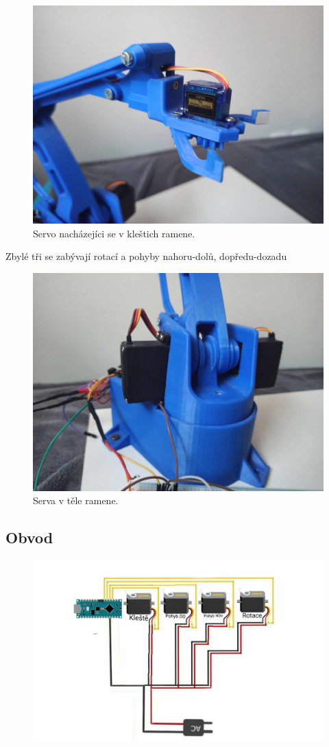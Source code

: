 \documentclass[12pt, a4paper,
twoside,        %
openright
]{report}
\begin{document}
{\begin{figure}[h]
	\centering
	\includegraphics[width=0.5\linewidth]{image/kleste.jpg} 
	
	\caption{Servo nacházejíci se v kleštich ramene\cite{servo-kleste}.} %
	\label{fig:Servo-kleste} %
\end{figure}

	Zbylé tři se zabývají rotací a pohyby nahoru-dolů, dopředu-dozadu

\begin{figure}[h]
	
	\centering
	\includegraphics[width=0.5\linewidth]{image/serva.jpg} 
	
	\caption{Serva v těle ramene.} %
	\label{fig:Serva} %
\end{figure}

\newpage

\subsection{Obvod}

\begin{figure}[h]
	
	\centering
	\includegraphics[width=0.9\linewidth]{image/obvod.jpg} 
	

\end{figure}}
\end{document}
